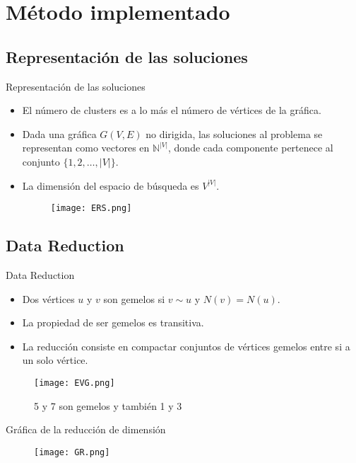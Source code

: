 \documentclass[10pt]{beamer}
\begin{document}
\section{Método implementado}
\subsection{Representación de las soluciones}
\begin{frame}{Representación de las soluciones}
\begin{itemize}
\item El número de clusters es a lo más el número de vértices de la gráfica.
\item Dada una gráfica $G(V,E)$ no dirigida, las soluciones al problema se representan como vectores en $\mathbb{N}^{|V|}$, donde cada componente pertenece al conjunto $\{1,2,\ldots,|V|\}$.
\item La dimensión del espacio de búsqueda es $V^{|V|}$.
\begin{figure}
\texttt{[image: ERS.png]}
\end{figure}
\end{itemize}
\end{frame}

\subsection{Data Reduction}
\begin{frame}{Data Reduction}
\begin{itemize}
\item Dos vértices $u$ y $v$ son gemelos si $v\sim u$ y $N(v)=N(u)$.
\item La propiedad de ser gemelos es transitiva.
\item La reducción consiste en compactar conjuntos de vértices gemelos entre si a un solo vértice.
\end{itemize}

\begin{figure}
\texttt{[image: EVG.png]}
\caption{5 y 7 son gemelos y también 1 y 3}
\end{figure}
\end{frame}

\begin{frame}{Gráfica de la reducción de dimensión}
\begin{figure}[H]
\texttt{[image: GR.png]}
\end{figure}
\end{frame}
\end{document}
